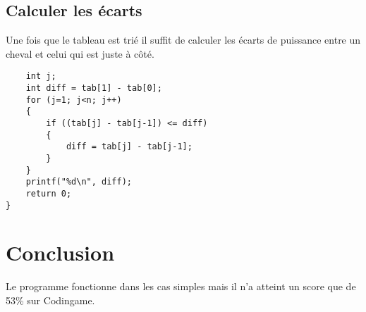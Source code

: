 \documentclass{article}
\begin{document}
\subsection{Calculer les écarts}

Une fois que le tableau est trié il suffit de calculer les écarts de puissance entre un cheval et celui qui est juste à côté.

\begin{verbatim}
    int j;
    int diff = tab[1] - tab[0];
    for (j=1; j<n; j++)
    {
        if ((tab[j] - tab[j-1]) <= diff)
        {
            diff = tab[j] - tab[j-1];
        }
    }
    printf("%d\n", diff);
    return 0;
}
\end{verbatim}

\section{Conclusion}

Le programme fonctionne dans les cas simples mais il n'a atteint un score que de 53\% sur Codingame.
\end{document}
